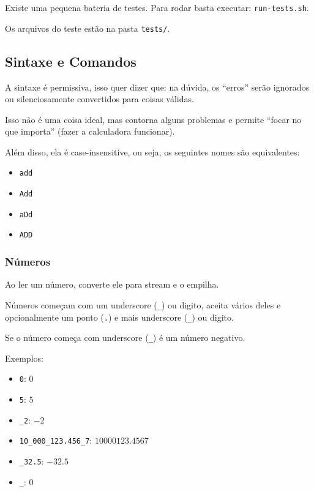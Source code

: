 \documentclass{article}
\begin{document}
Existe uma pequena bateria de testes.
Para rodar basta executar:
\texttt{run-tests.sh}.

Os arquivos do teste estão na pasta \texttt{tests/}.

\subsection{Sintaxe e Comandos}

A sintaxe é permissiva,
isso quer dizer que:
na dúvida,
os ``erros'' serão ignorados
ou silenciosamente convertidos para coisas válidas.

Isso não é uma coisa ideal,
mas contorna alguns problemas e
permite ``focar no que importa''
(fazer a calculadora funcionar).

Além disso, ela é case-insensitive,
ou seja, os seguintes nomes são equivalentes:
\begin{multicols}{4}
\begin{itemize}
    \item \texttt{add}
    \item \texttt{Add}
    \item \texttt{aDd}
    \item \texttt{ADD}
\end{itemize}
\end{multicols}

\subsubsection{Números}

Ao ler um número, converte ele para stream e o empilha.

Números começam com um underscore (\texttt{\_}) ou digito,
aceita vários deles e opcionalmente um ponto (\texttt{.}) e
mais underscore (\texttt{\_}) ou digito.

Se o número começa com underscore (\texttt{\_})
é um número negativo.

Exemplos:
\begin{multicols}{2}
\begin{itemize}
    \item \texttt{0}: \(0\)
    \item \texttt{5}: \(5\)
    \item \texttt{\_2}: \(-2\)
    \item \texttt{10\_000\_123.456\_7}: \(10000123.4567\)
    \item \texttt{\_32.5}: \(-32.5\)
    \item \texttt{\_}: \(0\)
\end{itemize}
\end{multicols}
\end{document}
